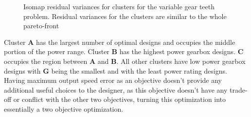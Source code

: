 \begin{figure}[ht]\begin{center}
\caption{Isomap residual variances for clusters for the variable gear teeth
  problem. Residual variances for the clusters are similar to the whole
  pareto-front}
 \label{gtvClustersRV}
\end{center}\end{figure}

Cluster \textbf{A} has the largest number of optimal designs and occupies
the middle portion of the power range. Cluster \textbf{B} has the highest
power gearbox designs. \textbf{C} occupies the region between \textbf{A}
and \textbf{B}. All other clusters have low power gearbox designs with
\textbf{G} being the smallest and with the least power rating designs.
Having maximum output speed error as an objective doesn't provide any
additional useful choices to the designer, as this objective doesn't have
any trade-off or conflict with the other two objectives, turning this
optimization into essentially a two objective optimization.




